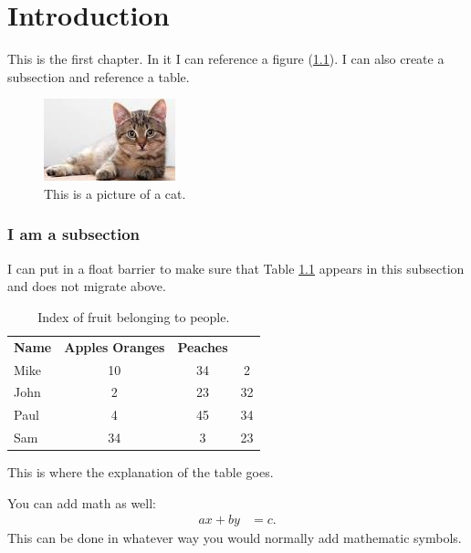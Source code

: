 \documentclass[11pt, oneside]{turabian-thesis}
\begin{document}
\tableofcontents
\listoffigures
\listoftables


\chapter{Introduction} \label{chpt:intro}

This is the first chapter. In it I can reference a figure (\ref{fig:figureLabel}). I can also create a subsection and reference a table.
\begin{figure}[htbp] %
   \centering
   \includegraphics[scale=.75]{cat.jpg} 
   \caption{This is a picture of a cat.}
   \label{fig:figureLabel}
\end{figure}

\FloatBarrier
\subsection{I am a subsection} \label{chpt:subsection}
I can put in a float barrier to make sure that Table \ref{tbl:CSperf} appears in this subsection and does not migrate above.\\ %

\begin{table}[h!] \scriptsize %
\caption{Index of fruit belonging to people.} %
\begin{center}
\begin{tabular}{ l c c c }
	\toprule
		\textbf{Name} & \textbf{Apples} \textbf{Oranges} & \textbf{Peaches}\\
		\cmidrule(r){1 - 4}
	Mike & 10 & 34 & 2\\
	John & 2 & 23 & 32\\
	Paul & 4 & 45 & 34\\
	Sam & 34 & 3 & 23\\
	\bottomrule
\end{tabular}
\end{center}
\footnotesize{This is where the explanation of the table goes.}
\label{tbl:CSperf}
\end{table}

You can add math as well:
\begin{align}
	ax + by &= c.
\end{align}
This can be done in whatever way you would normally add mathematic symbols.



\end{document}
